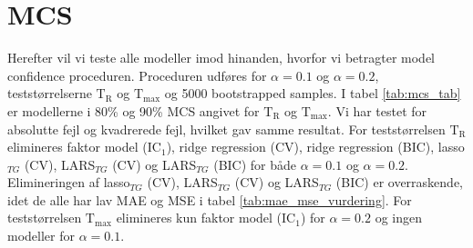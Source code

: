 \section{MCS} 
Herefter vil vi teste alle modeller imod hinanden, hvorfor vi betragter model confidence proceduren.
Proceduren udføres for \(\alpha = 0.1\) og \(\alpha = 0.2\), teststørrelserne \(\text{T}_\text{R}\) og \(\text{T}_\text{max}\) og 5000 bootstrapped samples.
I tabel \ref{tab:mcs_tab} er modellerne i 80\% og 90\% MCS angivet for \(\text{T}_\text{R}\) og \(\text{T}_\text{max}\).
Vi har testet for absolutte fejl og kvadrerede fejl, hvilket gav samme resultat.
For teststørrelsen \(\text{T}_\text{R}\) elimineres faktor model (IC\(_1\)), ridge regression (CV), ridge regression (BIC), lasso\(_{TG}\) (CV), LARS\(_{TG}\) (CV) og LARS\(_{TG}\) (BIC) for både \(\alpha = 0.1\) og \(\alpha = 0.2\).
Elimineringen af lasso\(_{TG}\) (CV), LARS\(_{TG}\) (CV) og LARS\(_{TG}\) (BIC) er overraskende, idet de alle har lav MAE og MSE i tabel \ref{tab:mae_mse_vurdering}. 
For teststørrelsen \(\text{T}_\text{max}\) elimineres kun faktor model (IC\(_1\)) for \(\alpha = 0.2\) og ingen modeller for \(\alpha = 0.1\).
%

%